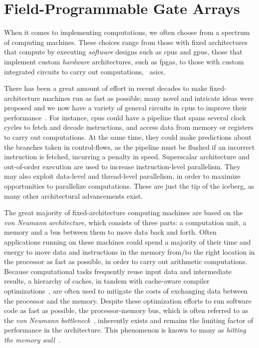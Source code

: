 \section{Field-Programmable Gate Arrays}
\label{bg:sec:fpga}


When it comes to implementing computations, we often choose from a spectrum of
computing machines.  These choices range from those with fixed architectures
that compute by executing \emph{software} designs such as \glspl{cpu} and
\glspl{gpu}, those that implement custom \emph{hardware} architectures,
such as \glspl{fpga}, to those with custom integrated circuits to carry out
computations, \ie~\glspl{asic}.

There has been a great amount of effort in recent decades to make
fixed-architecture machines run as fast as possible; many novel and intricate
ideas were proposed and we now have a variety of general circuits in
\glspl{cpu} to improve their performance~\cite{comparch}.  For instance,
\glspl{cpu} could have a pipeline that spans several clock cycles to fetch and
decode instructions, and access data from memory or registers to carry out
computations.  At the same time, they could make predictions about the branches
taken in control-flows, as the pipeline must be flushed if an incorrect
instruction is fetched, incurring a penalty in speed.  Superscalar architecture
and out-of-order execution are used to increase instruction-level parallelism.
They may also exploit data-level and thread-level parallelism, in order to
maximize opportunities to parallelize computations.  These are just the tip of
the iceberg, as many other architectural advancements exist.

The great majority of fixed-architecture computing machines are based on the
\emph{von Neumann architecture}, which consists of three parts: a computation
unit, a memory and a bus between them to move data back and forth.  Often
applications running on these machines could spend a majority of their time
and energy to move data and instructions in the memory from/to the right
location in the processor as fast as possible, in order to carry out arithmetic
computations.  Because computational tasks frequently reuse input data and
intermediate results, a hierarchy of caches, in tandem with cache-aware
compiler optimizations~\cite{kowarschik03}, are often used to mitigate the
costs of exchanging data between the processor and the memory.  Despite
these optimization efforts to run software code as fast as possible, the
processor-memory bus, which is often referred to as the \emph{von Neumann
bottleneck}~\cite{backus78}, inherently exists and remains the limiting factor
of performance in the architecture.  This phenomenon is known to many as
\emph{hitting the memory wall}~\cite{bacon13, wulf94}.

